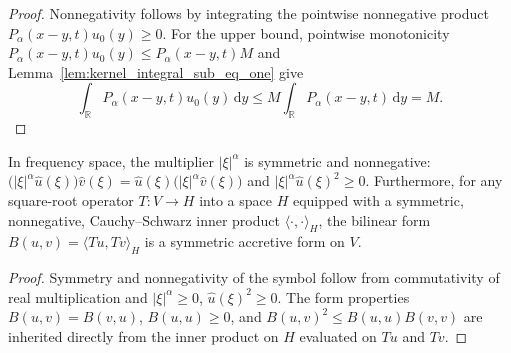 \begin{proof}
\leanok
Nonnegativity follows by integrating the pointwise nonnegative product $P_\alpha(x - y, t) u_0(y) \ge 0$. For the upper bound, pointwise monotonicity $P_\alpha(x - y, t) u_0(y) \le P_\alpha(x - y, t) M$ and Lemma~\ref{lem:kernel_integral_sub_eq_one} give
\[
  \int_{\mathbb{R}} P_\alpha(x - y, t) u_0(y)\, \mathrm{d}y \le M \int_{\mathbb{R}} P_\alpha(x - y, t)\, \mathrm{d}y = M.
\]
\end{proof}

\begin{theorem}\label{thm:whole_line_form}
\leanok
In frequency space, the multiplier $\lvert \xi \rvert^\alpha$ is symmetric and nonnegative: $\bigl(\lvert \xi \rvert^\alpha \widehat{u}(\xi)\bigr) \widehat{v}(\xi) = \widehat{u}(\xi) \bigl(\lvert \xi \rvert^\alpha \widehat{v}(\xi)\bigr)$ and $\lvert \xi \rvert^\alpha \widehat{u}(\xi)^2 \ge 0$. Furthermore, for any square-root operator $T : V \to H$ into a space $H$ equipped with a symmetric, nonnegative, Cauchy--Schwarz inner product $\langle \cdot, \cdot \rangle_H$, the bilinear form $B(u, v) = \langle Tu, Tv \rangle_H$ is a symmetric accretive form on $V$.
\end{theorem}

\begin{proof}
\leanok
Symmetry and nonnegativity of the symbol follow from commutativity of real multiplication and $\lvert \xi \rvert^\alpha \ge 0$, $\widehat{u}(\xi)^2 \ge 0$. The form properties $B(u, v) = B(v, u)$, $B(u, u) \ge 0$, and $B(u, v)^2 \le B(u, u) B(v, v)$ are inherited directly from the inner product on $H$ evaluated on $Tu$ and $Tv$.
\end{proof}
